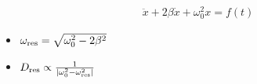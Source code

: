 

\vspace*{\fill}
\centering

\begin{align*}
    \ddot{x} + 2\beta \dot{x} + \omega_0^2 x = f(t) 
\end{align*}

\begin{itemize}
    \item $\omega_{\rm res} = \sqrt{\omega_0^2 - 2\beta^2}$
    \item $D_{\rm res} \propto \frac{1}{|\omega_0^2 - \omega_{\rm res}^2|}$
\end{itemize}

\centering
\vspace*{\fill}

